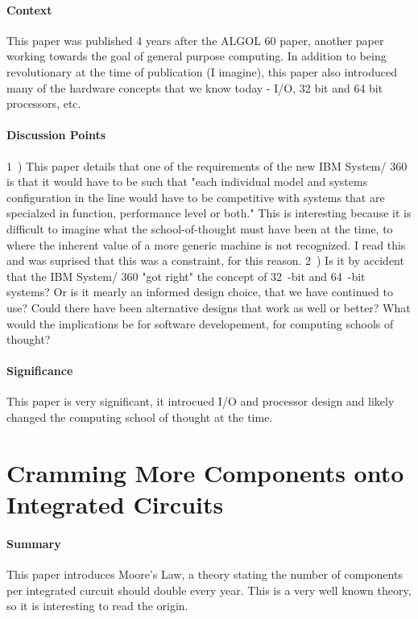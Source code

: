 \paragraph{\textbf{Context}}
This paper was published 4 years after the ALGOL 60 paper, another paper
working towards the goal of general purpose computing. In addition to being
revolutionary at the time of publication (I imagine), this paper also
introduced many of the hardware concepts that we know today - I/O, 32 bit
and 64 bit processors, etc.
\paragraph{\textbf{Discussion Points}}
1~) This paper details that one of the requirements of the new IBM System/
360 is that it would have to be such that "each individual model and
systems configuration in the line would have to be competitive with systems
that are specialzed in function, performance level or both." This is
interesting because it is difficult to imagine what the school-of-thought
must have been at the time, to where the inherent value of a more generic
machine is not recognized. I read this and was suprised that this was a
constraint, for this reason.
2~) Is it by accident that the IBM System/ 360 "got right" the concept of
32~-bit and 64~-bit systems? Or is it mearly an informed design choice, that
we have continued to use? Could there have been alternative designs that
work as well or better? What would the implications be for software
developement, for computing schools of thought?
\paragraph{\textbf{Significance}}
This paper is very significant, it introcued I/O and processor design and
likely changed the computing school of thought at the time.


\section {Cramming More Components onto Integrated Circuits
\cite{moore1965cramming}}


\paragraph{\textbf{Summary}}
This paper introduces Moore's Law, a theory stating the number of components
per integrated curcuit should double every year. This is a very well known
theory, so it is interesting to read the origin.


